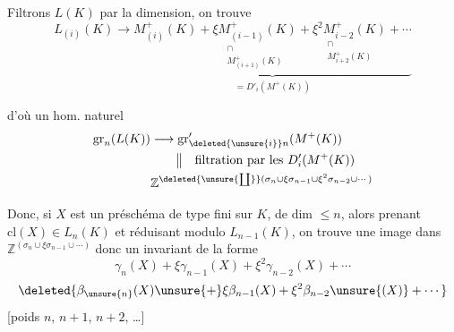 Filtrons $L(K)$ par la dimension, on trouve
\[
L_{(i)}(K)\longrightarrow
\underbrace{M^+_{(i)}(K)+\underset{\substack{\cap\\ M^+_{(i+1)}(K)}}{\xi M^+_{(i-1)}(K)}
+\underset{\substack{\cap\\ M^+_{i+2}(K)}}{\xi^2 M^+_{i-2}(K)}+\dotsb}_{=D'_i(M^+(K))}
\]
 

d'où un hom. naturel
\[
\begin{aligned}
\mathrm{gr}_n(L(K))&\longrightarrow\mathrm{gr}'_{\deleted{\unsure{i}}n}(M^+(K))\\
&\hspace{2em}\big\Vert\quad\text{filtration par les }D'_i(M^+(K))\\
&\mathbb Z^{\deleted{\unsure{\coprod}}(\sigma_n\cup\xi\sigma_{n-1}\cup\xi^2\sigma_{n-2}\cup\dotsb)}
\end{aligned}
\]

Donc, si $X$ est un préschéma de type fini  sur $K$, de dim $\leq n$, alors prenant $\mathrm{cl}(X)\in L_n(K)$ et réduisant modulo $L_{n-1}(K)$, on trouve une image dans $\mathbb Z^{(\sigma_n\cup\xi\sigma_{n-1}\cup\dotsb)}$ donc un invariant de la forme
\[
\gamma_n(X)+\xi\gamma_{n-1}(X)+\xi^2\gamma_{n-2}(X)+\dotsb
\]
\[
\deleted{\beta_{\unsure{n}}(X)\unsure{+}\xi\beta_{n-1}(X)+\xi^2\beta_{n-2}\unsure{(X)}+\dotsb}
\]
 [poids $n$, $n+1$, $n+2$, \dots]
